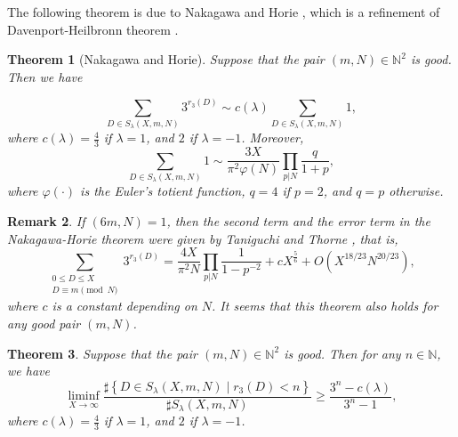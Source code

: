 \documentclass{amsart}
\newtheorem{theorem}{Theorem}[section]
\newtheorem{remark}[theorem]{Remark}
\begin{document}
The following theorem is due to Nakagawa and Horie \cite{nh}, which is a refinement of   Davenport-Heilbronn theorem  \cite{dh}.
\begin{theorem}[Nakagawa and Horie]\label{nh}
Suppose that the pair $(m,N)\in\mathbb{N}^2$ is good. Then we have


    \[
    \sum_{D \in S_{\lambda}(X, m, N)} 3^{r_{3}(D)} \sim c(\lambda)  \sum_{D \in S_{\lambda}(X, m, N)}1,
    \]
    where $c(\lambda)=\frac{4}{3}$ if $\lambda=1$, and $2$ if $\lambda=-1$. Moreover,
    \[\sum_{D \in S_{\lambda}(X, m, N)}1\sim \frac{3X}{\pi^2 \varphi(N)}\prod_{p|N}\frac{q}{1+p},\]
where $\varphi(\cdot)$ is the Euler's totient function, $q=4$ if $p=2$, and $q=p$ otherwise.

\end{theorem}

\begin{remark}If   $(6m,N)=1$, then the second term and the error term in the Nakagawa-Horie theorem were given by Taniguchi and Thorne \cite[Theorem 1.6]{tt}, that is,
 \[\sum_{\substack{0\le   D\le X\\D\equiv m\pmod N }} 3^{r_{3}(D)} =\frac{4X}{\pi^2 N}\prod_{p|N}\frac{1}{1-p^{-2}}   +cX^\frac{5}{6}+O(X^{18/23}N^{20/23}),
\]
where $c$ is a constant depending on $N$. 
It seems that this theorem also holds for any good pair $(m,N)$.
\end{remark}

\begin{theorem}\label{be}
Suppose that the pair $(m,N)\in\mathbb{N}^2$ is good. Then
 for any $n \in \mathbb{N}$, we have
\begin{equation}\label{1}
    \liminf_{X \rightarrow \infty} \frac{\sharp\left\{D \in S_{\lambda}(X, m, N) \mid r_{3}(D) <n \right\}}{\sharp S_{\lambda}(X, m, N)} \ge\frac{3^n-c(\lambda) }{3^{n}-1},
\end{equation}
where $c(\lambda)=\frac{4}{3}$ if $\lambda=1$, and $2$ if $\lambda=-1$.
\end{theorem}
\end{document}
